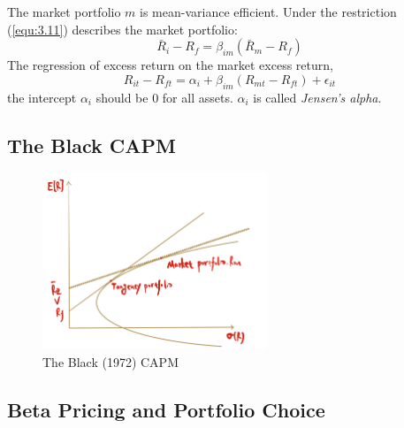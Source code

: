 \documentclass[11pt,green,twocol,citestyle=authoryear, bibstyle=authoryear]{elegantbook}
\begin{document}
The market portfolio $ m $ is mean-variance efficient. Under the restriction (\ref{equ:3.11}) describes the market portfolio:
\begin{equation}\label{equ:3.12}
    \bar{R}_i-R_f=\beta_{i m}\left(\bar{R}_m-R_f\right)
\end{equation}
The regression of excess return on the market excess return,
\begin{equation}\label{equ:3.13}
    R_{i t}-R_{f t}=\alpha_i+\beta_{i m}\left(R_{m t}-R_{f t}\right)+\epsilon_{i t}
\end{equation}
the intercept $ \alpha_i $ should be $ 0 $ for all assets. $ \alpha_i $ is called \textit{Jensen's alpha}.

\subsection{The Black CAPM}
\begin{figure}[!h]
    \centering
    \includegraphics[width = 0.6\textwidth]{blackcapm.pdf}
    \caption{The Black (1972) CAPM}
\end{figure}

\subsection{Beta Pricing and Portfolio Choice}
\end{document}
